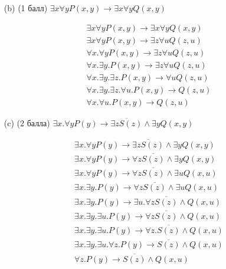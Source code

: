 \begin{enumerate}
\begin{itemize}
\begin{solution}
        \end{solution}
        \item[(b)] (1 балл) $\exists x\forall y P(x, y) \rightarrow \exists x\forall y Q(x, y)$
        \begin{solution}
            \begin{align*}
                &\exists x\forall y P(x, y) \rightarrow \exists x\forall y Q(x, y) \\
                &\exists x\forall y P(x, y) \rightarrow \exists z\forall u Q(z, u) \\
                &\forall x . \forall y P(x, y) \rightarrow \exists z\forall u Q(z, u) \\
                &\forall x . \exists y . P(x, y) \rightarrow \exists z\forall u Q(z, u) \\
                &\forall x . \exists y . \exists z . P(x, y) \rightarrow \forall u Q(z, u) \\
                &\forall x . \exists y . \exists z . \forall u . P(x, y) \rightarrow Q(z, u) \\
                &\forall x . \forall u . P(x, y) \rightarrow Q(z, u)
            \end{align*}
        \end{solution}
        \item[(c)] (2 балла) $\exists x. \forall y P(y) \rightarrow \overline{\exists z S(z)} \land \exists y Q(x, y)$
        \begin{solution}
            \begin{align*}
                &\exists x. \forall y P(y) \rightarrow \overline{\exists z S(z)} \land \exists y Q(x, y) \\
                &\exists x. \forall y P(y) \rightarrow \forall z \overline{S(z)} \land \exists y Q(x, y) \\
                &\exists x. \forall y P(y) \rightarrow \forall z \overline{S(z)} \land \exists u Q(x, u) \\
                &\exists x. \exists y . P(y) \rightarrow \forall z \overline{S(z)} \land \exists u Q(x, u) \\
                &\exists x. \exists y . P(y) \rightarrow \exists u . \forall z \overline{S(z)} \land  Q(x, u) \\
                &\exists x. \exists y . \exists u . P(y) \rightarrow \forall z \overline{S(z)} \land  Q(x, u) \\
                &\exists x. \exists y . \exists u . P(y) \rightarrow \forall z . \overline{S(z)} \land  Q(x, u) \\
                &\exists x. \exists y . \exists u . \forall z . P(y) \rightarrow \overline{S(z)} \land  Q(x, u) \\
                &\forall z . P(y) \rightarrow \overline{S(z)} \land  Q(x, u)
            \end{align*}
        \end{solution}
    \end{itemize}
\end{enumerate}
\clearpage
